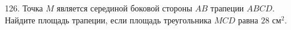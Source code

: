 126. Точка $M$ является серединой боковой стороны $AB$ трапеции $ABCD.$ Найдите площадь трапеции, если площадь треугольника $MCD$ равна $28\text{ см}^2.$\\
